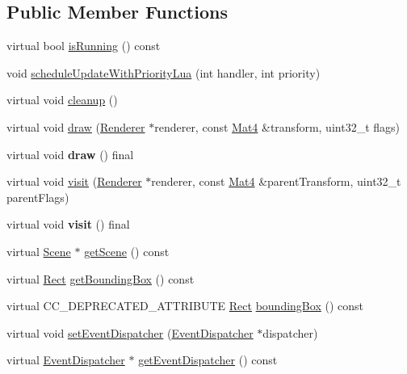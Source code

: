 \subsection*{Public Member Functions}
\begin{DoxyCompactItemize}
\item 
virtual bool \hyperlink{classNode_aebd879ffa85ad31896051073e1d7a6d8}{is\+Running} () const
\item 
void \hyperlink{classNode_a0fc543c82cc9b139cfb57f65eb770fb0}{schedule\+Update\+With\+Priority\+Lua} (int handler, int priority)
\item 
virtual void \hyperlink{classNode_aa2de84c6cdeec9cd647d236c30ee0567}{cleanup} ()
\item 
virtual void \hyperlink{classNode_abcf85087a15901deb7c6c1231634c8ab}{draw} (\hyperlink{classRenderer}{Renderer} $\ast$renderer, const \hyperlink{classMat4}{Mat4} \&transform, uint32\+\_\+t flags)
\item 
\mbox{\label{classNode_a0ee9c2703e4e4fd4ac75cae4593ef78f}} 
virtual void {\bfseries draw} () final
\item 
virtual void \hyperlink{classNode_a7d794a5e30745611ec33881a625edf26}{visit} (\hyperlink{classRenderer}{Renderer} $\ast$renderer, const \hyperlink{classMat4}{Mat4} \&parent\+Transform, uint32\+\_\+t parent\+Flags)
\item 
\mbox{\label{classNode_a751486a54cdcb7f75db9f11be8469818}} 
virtual void {\bfseries visit} () final
\item 
virtual \hyperlink{classScene}{Scene} $\ast$ \hyperlink{classNode_a5a61a356773de436f80e55228ea01b66}{get\+Scene} () const
\item 
virtual \hyperlink{classRect}{Rect} \hyperlink{classNode_a7b3849315467fdb992b273fbd3b3fc66}{get\+Bounding\+Box} () const
\item 
virtual C\+C\+\_\+\+D\+E\+P\+R\+E\+C\+A\+T\+E\+D\+\_\+\+A\+T\+T\+R\+I\+B\+U\+TE \hyperlink{classRect}{Rect} \hyperlink{classNode_a7744d16609dfc7609e889129b8672afb}{bounding\+Box} () const
\item 
virtual void \hyperlink{classNode_add71c94aeabd15707311742797d21bb3}{set\+Event\+Dispatcher} (\hyperlink{classEventDispatcher}{Event\+Dispatcher} $\ast$dispatcher)
\item 
virtual \hyperlink{classEventDispatcher}{Event\+Dispatcher} $\ast$ \hyperlink{classNode_ae6ba7b287241f031b271d7d680f070f3}{get\+Event\+Dispatcher} () const

\end{DoxyCompactItemize}
